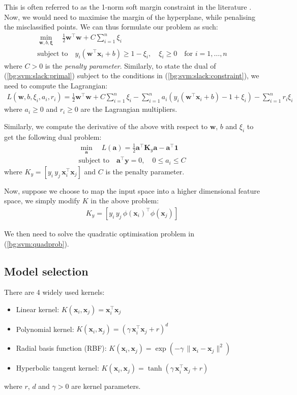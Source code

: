 \documentclass[12pt, twoside, a4paper]{report}
\def\vec{\boldsymbol}
\begin{document}
This is often referred to as the 1-norm soft margin constraint in the literature \cite{RefWorks:127}. Now, we would need to maximise the margin of the hyperplane, while penalising the misclassified points. We can thus formulate our problem as such:
\begin{gather}
\min_{\vec{w}, b, \vec{\xi}} \quad \frac{1}{2}\vec{w}^\top \vec{w} + C \sum_{i=1}^n \xi_i \label{bg:svm:slack:primal} \\
\text{subject to} \quad y_i(\vec{w}^\top \vec{x}_i + b) \geq 1 - \xi_i , \quad 
\xi_i \geq 0 \quad \text{for $i = 1, \dots , n$}\label{bg:svm:slack:constraint}
\end{gather}
where $C>0$ is the \textit{penalty parameter}. Similarly, to state the dual of (\ref{bg:svm:slack:primal}) subject to the conditions in (\ref{bg:svm:slack:constraint}), we need to compute the Lagrangian:
\begin{align*}
L(\vec{w}, b, \xi_i, a_i, r_i) =
\frac{1}{2} \vec{w}^\top \vec{w} + C \sum_{i=1}^n \xi_i - \sum_{i=1}^n a_i(y_i(\vec{w}^\top \vec{x}_i + b) - 1 + \xi_i) - \sum_{i=1}^n r_i\xi_i
\end{align*}
where $a_i \geq 0$ and $r_i \geq 0$ are the Lagrangian multipliers.

Similarly, we compute the derivative of the above with respect to $\vec{w}$, $b$ and $\xi_i$ to get the following dual problem:
\begin{gather}
\min_{\vec{a}} \quad L(\vec{a}) = \frac{1}{2}\vec{a}^\top \vec{K}_y \vec{a} - \vec{a}^\top \vec{1} \label{bg:svm:quadprob} \\
\text{subject to} \quad \vec{a}^\top \vec{y} = 0, \quad 0 \leq a_i \leq C 
\end{gather}
where $K_y = [y_i \, y_j \, \vec{x}_i^\top \vec{x}_j]$ and $C$ is the penalty parameter.

Now, suppose we choose to map the input space into a higher dimensional feature space, we simply modify $K$ in the above problem:
\begin{align*}
K_y = [y_i \, y_j \, \phi(\vec{x}_i)^\top \phi(\vec{x}_j)]
\end{align*}

We then need to solve the quadratic optimisation problem in (\ref{bg:svm:quadprob}).

\subsection{Model selection} \label{bg:ml:svm:model}
There are 4 widely used kernels:
\begin{itemize}
\item Linear kernel: $K(\vec{x}_i, \vec{x}_j) = \vec{x}_i^\top \vec{x}_j$
\item Polynomial kernel: $K(\vec{x}_i, \vec{x}_j) = (\gamma \, \vec{x}_i^\top \vec{x}_j + r)^d$
\item Radial basis function (RBF): $K(\vec{x}_i, \vec{x}_j) = \exp(-\gamma \, \| \vec{x}_i - \vec{x}_j \|^2)$
\item Hyperbolic tangent kernel: $K(\vec{x}_i, \vec{x}_j) = \tanh(\gamma \, \vec{x}_i^\top \vec{x}_j + r)$
\end{itemize}
where $r$, $d$ and $\gamma>0$ are kernel parameters.
\end{document}
